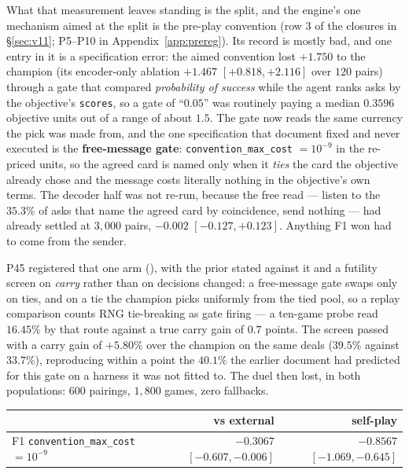 \documentclass[11pt,letterpaper]{article}
\begin{document}
What that measurement leaves standing is the split, and the engine's one
mechanism aimed at the split is the pre-play convention
(row 3 of the closures in \S\ref{sec:v11}; P5--P10 in Appendix~\ref{app:prereg}). Its record is mostly bad,
and one entry in it is a specification error: the aimed convention lost
$+1.750$ to the champion (its encoder-only ablation $+1.467$ $[+0.818,
+2.116]$ over $120$ pairs) through a gate that compared \emph{probability of
success} while the agent ranks asks by the objective's \texttt{scores}, so a
gate of ``$0.05$'' was routinely paying a median $0.3596$ objective units out
of a range of about $1.5$. The gate now reads the same currency the pick was
made from, and the one specification that document fixed and never executed
is the \textbf{free-message gate}: \texttt{convention\_max\_cost} $=10^{-9}$ in
the re-priced units, so the agreed card is named only when it \emph{ties} the
card the objective already chose and the message costs literally nothing in the
objective's own terms. The decoder half was not re-run, because the free read
--- listen to the $35.3\%$ of asks that name the agreed card by coincidence,
send nothing --- had already settled at $3{,}000$ pairs, $-0.002$ $[-0.127,
+0.123]$. Anything F1 won had to come from the sender.

P45 registered that one arm (), with
the prior stated against it and a futility screen on \emph{carry} rather than on
decisions changed: a free-message gate swaps only on ties, and on a tie the
champion picks uniformly from the tied pool, so a replay comparison counts RNG
tie-breaking as gate firing --- a ten-game probe read $16.45\%$ by that route
against a true carry gain of $0.7$ points. The screen passed
with a carry gain of $\mathbf{+5.80\%}$ over the champion on the same deals ($39.5\%$ against $33.7\%$),
reproducing within a point the $40.1\%$ the earlier document had
predicted for this gate on a harness it was not fitted to. The duel then lost,
in both populations: $600$ pairings, $1{,}800$ games, zero fallbacks.

\begin{center}
\small
\begin{tabular}{lrr}
\toprule
 & vs external & self-play \\
\midrule
F1 \texttt{convention\_max\_cost} $=10^{-9}$ & $\mathbf{-0.3067}$ $[-0.607, -0.006]$ & $\mathbf{-0.8567}$ $[-1.069, -0.645]$ \\
\bottomrule
\end{tabular}
\end{center}
\end{document}
